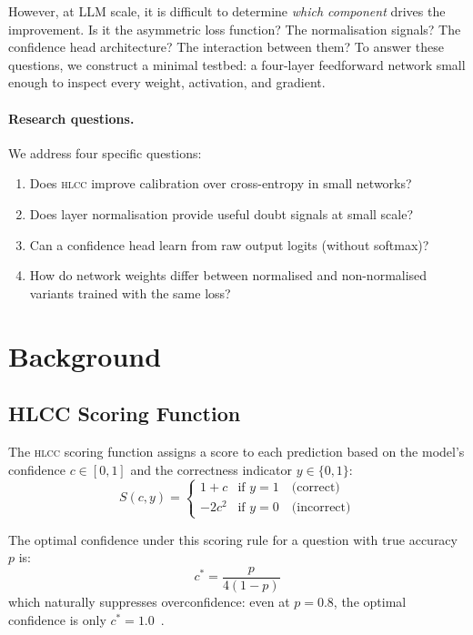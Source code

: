 \documentclass[11pt,a4paper]{article}
\newcommand{\hlcc}{\textsc{hlcc}}
\newcommand{\cstar}{c^{*}}
\begin{document}
However, at LLM scale, it is difficult to determine \emph{which
component} drives the improvement.  Is it the asymmetric loss
function?  The normalisation signals?  The confidence head
architecture?  The interaction between them?  To answer these
questions, we construct a minimal testbed: a four-layer feedforward
network small enough to inspect every weight, activation, and
gradient.

\paragraph{Research questions.}  We address four specific questions:
\begin{enumerate}[label=\textbf{Q\arabic*:}]
  \item Does \hlcc{} improve calibration over cross-entropy in small
        networks?
  \item Does layer normalisation provide useful doubt signals at
        small scale?
  \item Can a confidence head learn from raw output logits (without
        softmax)?
  \item How do network weights differ between normalised and
        non-normalised variants trained with the same loss?
\end{enumerate}

\section{Background}
\label{sec:background}

\subsection{HLCC Scoring Function}

The \hlcc{} scoring function assigns a score to each prediction based
on the model's confidence $c \in [0, 1]$ and the correctness
indicator $y \in \{0, 1\}$:
\begin{equation}
  S(c, y) = \begin{cases}
    1 + c & \text{if } y = 1 \quad \text{(correct)} \\
    -2c^2 & \text{if } y = 0 \quad \text{(incorrect)}
  \end{cases}
  \label{eq:hlcc}
\end{equation}

The optimal confidence under this scoring rule for a question with
true accuracy $p$ is:
\begin{equation}
  \cstar = \frac{p}{4(1-p)}
  \label{eq:optimal}
\end{equation}
which naturally suppresses overconfidence: even at $p = 0.8$, the
optimal confidence is only $\cstar = 1.0$~\cite{mccallum2026hlcc}.
\end{document}
